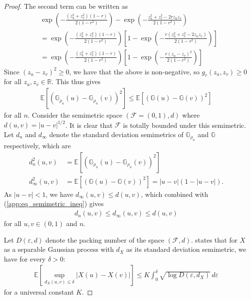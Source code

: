 \documentclass[11pt,a4paper]{article}
\newcommand{\R}{\mathbb{R}}
\newcommand{\E}{\mathbb{E}}
\begin{document}
\begin{appendices}
\begin{proof}
The second term can be written as
\begin{align*}
    &\exp\left(-\frac{(z_u^2 + z_v^2)(1-r)}{2(1-r^2)}\right)-\exp\left(-\frac{z_u^2 + z_v^2 - 2r z_u z_v}{2(1-r^2)}\right) \\
    &=\exp\left(-\frac{(z_u^2 + z_v^2)(1-r)}{2(1-r^2)}\right)\left[1 - \exp\left(-\frac{r(z_u^2+ z_v^2-2z_uz_v)}{2(1-r^2)}\right)\right]\\
    &= \exp\left(-\frac{(z_u^2 + z_v^2)(1-r)}{2(1-r^2)}\right)\left[1 - \exp\left(-\frac{r(z_u - z_v)^2}{2(1-r^2)}\right)\right]
\end{align*}
Since $(z_u - z_v)^2 \geq 0$, we have that the above is non-negative, so $g_r(z_u,z_v) \geq 0$ for all $z_u,z_v \in \R$. This thus gives
\begin{align}\label{app:eq_semimetric_ineq}
\E\left[\left(\mathbb{G}_{\rho_n}(u) - \mathbb{G}_{\rho_n}(v) \right)^2\right]\leq     \E\left[\left(\mathbb{G}(u) - \mathbb{G}(v) \right)^2\right] 
\end{align}
for all $n$. 
Consider the semimetric space $(\mathcal{F} = (0,1),d)$ where $d(u,v) = |u-v|^{1/2}$.
It is clear that $\mathcal{F}$ is totally bounded under this semimetric.
Let $d_{n}$ and $d_\infty$ denote the standard deviation semimetrics of $\mathbb{G}_{\rho_n}$ and $\mathbb{G}$ respectively, which are
\begin{align*}
    d_n^2(u,v) &= \E\left[\left(\mathbb{G}_{\rho_n}(u) - \mathbb{G}_{\rho_n}(v) \right)^2\right]\\
    d_\infty^2(u,v) &= \E\left[\left(\mathbb{G}(u) - \mathbb{G}(v) \right)^2\right]=|u-v|(1-|u-v|).
\end{align*}
As $|u-v| < 1$, we have $d_\infty(u,v)\leq d(u,v)$, which combined with (\ref{app:eq_semimetric_ineq}) gives
\begin{align*}
    d_{n}(u,v) \leq d_\infty(u,v) \leq d(u,v)
\end{align*}
for all $u,v \in(0,1)$ and $n$.

Let $D(\varepsilon,d)$ denote the packing number of the space $(\mathcal{F},d)$.
\citet[Corollary 2.2.9]{vanderVaart2023} states that for $X$ as a separable Gaussian process with $d_X$ as its standard deviation semimetric, we have for every $\delta > 0$:
\begin{align*}
    \E\left[\sup_{d_X(u,v)\leq \delta}|X(u)-X(v)|\right] \leq K \int_0^{\delta} \sqrt{\log D(\varepsilon,d_X)}\, d\varepsilon
\end{align*}
for a universal constant $K$. 


\end{proof}
\end{appendices}
\end{document}
